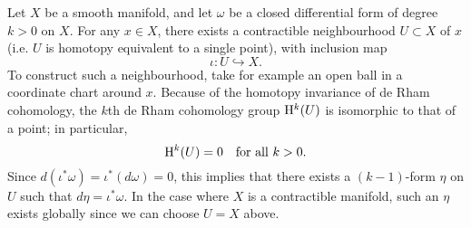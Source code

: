 \documentclass[12pt]{article}
\begin{document}
Let $X$ be a smooth manifold, and let $\omega$ be a closed differential form of degree $k>0$ on $X$.  For any $x\in X$, there exists a contractible neighbourhood $U\subset X$ of $x$ (i.e. $U$ is homotopy equivalent to a single point), with inclusion map
$$\iota\colon U\hookrightarrow X.$$
To construct such a neighbourhood, take for example an open ball in a coordinate chart around $x$.  Because of the homotopy invariance of de Rham cohomology, the $k$th de Rham cohomology group ${\rm H}^k(U)$ is isomorphic to that of a point; in particular,
$$
{\rm H}^k(U)=0\quad\hbox{for all $k>0$}.
$$
Since $d(\iota^*\omega)=\iota^*(d\omega)=0$, this implies that there exists a $(k-1)$-form $\eta$ on $U$ such that $d\eta=\iota^*\omega$.  In the case where $X$ is a contractible manifold, such an $\eta$ exists globally since we can choose $U=X$ above.
\end{document}
